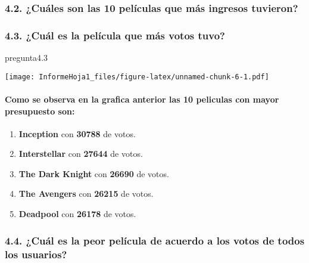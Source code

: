 \documentclass[
]{article}
\newenvironment{Shaded}{\begin{snugshade}}{\end{snugshade}}
\newcommand{\FloatTok}[1]{\textcolor[rgb]{0.00,0.00,0.81}{#1}}
\newcommand{\NormalTok}[1]{#1}
\providecommand{\tightlist}{%
  \setlength{\itemsep}{0pt}\setlength{\parskip}{0pt}}
\begin{document}
\hypertarget{cuuxe1les-son-las-10-peluxedculas-que-muxe1s-ingresos-tuvieron}{%
\subsubsection{4.2. ¿Cuáles son las 10 películas que más ingresos
tuvieron?}\label{cuuxe1les-son-las-10-peluxedculas-que-muxe1s-ingresos-tuvieron}}

\hypertarget{cuuxe1l-es-la-peluxedcula-que-muxe1s-votos-tuvo}{%
\subsubsection{4.3. ¿Cuál es la película que más votos
tuvo?}\label{cuuxe1l-es-la-peluxedcula-que-muxe1s-votos-tuvo}}

\begin{Shaded}
\begin{Highlighting}[]
\NormalTok{pregunta4}\FloatTok{.3}
\end{Highlighting}
\end{Shaded}

\texttt{[image: InformeHoja1\_files/figure-latex/unnamed-chunk-6-1.pdf]}

\hypertarget{como-se-observa-en-la-grafica-anterior-las-10-peliculas-con-mayor-presupuesto-son-1}{%
\paragraph{\texorpdfstring{Como se observa en la grafica anterior las 10
peliculas con mayor presupuesto
son:\n}{Como se observa en la grafica anterior las 10 peliculas con mayor presupuesto son:}}\label{como-se-observa-en-la-grafica-anterior-las-10-peliculas-con-mayor-presupuesto-son-1}}

\begin{enumerate}
\def\labelenumi{\arabic{enumi}.}
\tightlist
\item
  \textbf{Inception} con \textbf{30788} de votos.
\item
  \textbf{Interstellar} con \textbf{27644} de votos.
\item
  \textbf{The Dark Knight} con \textbf{26690} de votos.
\item
  \textbf{The Avengers} con \textbf{26215} de votos.
\item
  \textbf{Deadpool} con \textbf{26178} de votos.
\end{enumerate}

\hypertarget{cuuxe1l-es-la-peor-peluxedcula-de-acuerdo-a-los-votos-de-todos-los-usuarios}{%
\subsubsection{4.4. ¿Cuál es la peor película de acuerdo a los votos de
todos los
usuarios?}\label{cuuxe1l-es-la-peor-peluxedcula-de-acuerdo-a-los-votos-de-todos-los-usuarios}}
\end{document}
